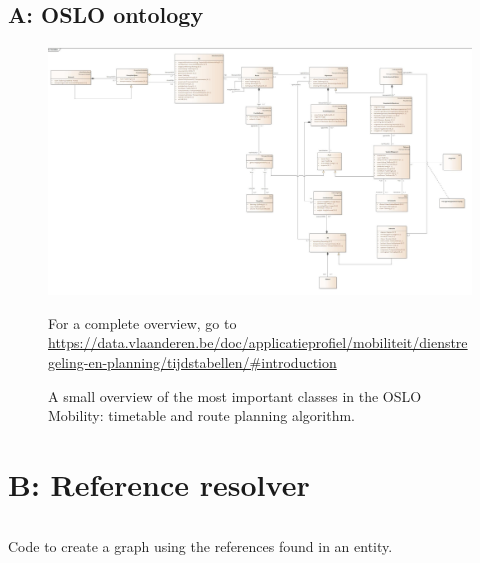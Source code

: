 \begin{appendices}

\newpage

\begin{landscape}
\section*{A: OSLO ontology}
\label{appendix:oslo:ontology}
    \begin{figure}[H]
    \centering
    \includegraphics[width=1.4\textwidth]{images/overview.jpg}
    \caption{A small overview of the most important classes in the OSLO Mobility: timetable and route planning algorithm. }
    \tiny For a complete overview, go to \url{https://data.vlaanderen.be/doc/applicatieprofiel/mobiliteit/dienstregeling-en-planning/tijdstabellen/#introduction}
    \label{fig:appendix:Ontology:oslo:overview}
\end{figure}
\end{landscape}


\section*{B: Reference resolver}
\begin{listing}[H]
\inputminted[frame=single,linenos,breaklines]{TypeScript}{code/resolve_entities.tex}
\caption{Code to create a graph using the references found in an entity.}
\label{code:resolve}
\end{listing}


\end{appendices}
